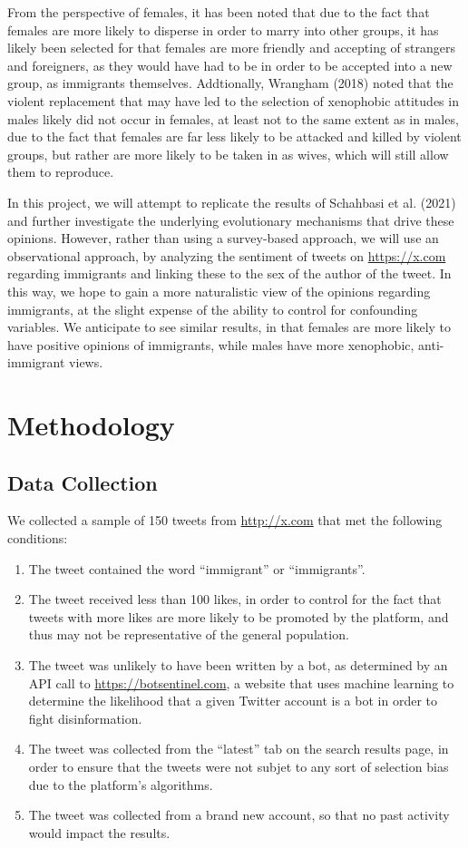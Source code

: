 \documentclass{article}
\begin{document}
From the perspective of females, it has been noted that due to the fact that females are more likely to disperse in order to marry into other groups, it has likely been selected for that females are more friendly and accepting of strangers and foreigners, as they would have had to be in order to be accepted into a new group, as immigrants themselves\cite{femaleOpinions}. Addtionally, Wrangham (2018) noted that the violent replacement that may have led to the selection of xenophobic attitudes in males likely did not occur in females, at least not to the same extent as in males, due to the fact that females are far less likely to be attacked and killed by violent groups, but rather are more likely to be taken in as wives, which will still allow them to reproduce\cite{femaleSafety}.

In this project, we will attempt to replicate the results of Schahbasi et al. (2021) and further investigate the underlying evolutionary mechanisms that drive these opinions. However, rather than using a survey-based approach, we will use an observational approach, by analyzing the sentiment of tweets on \url{https://x.com} regarding immigrants and linking these to the sex of the author of the tweet. In this way, we hope to gain a more naturalistic view of the opinions regarding immigrants, at the slight expense of the ability to control for confounding variables. We anticipate to see similar results, in that females are more likely to have positive opinions of immigrants, while males have more xenophobic, anti-immigrant views.

\section{Methodology}

\subsection{Data Collection}

We collected a sample of 150 tweets from \url{http://x.com} that met the following conditions:
\begin{enumerate}
    \item The tweet contained the word ``immigrant'' or ``immigrants''.
    \item The tweet received less than 100 likes, in order to control for the fact that tweets with more likes are more likely to be promoted by the platform, and thus may not be representative of the general population.
    \item The tweet was unlikely to have been written by a bot, as determined by an API call to \url{https://botsentinel.com}, a website that uses machine learning to determine the likelihood that a given Twitter account is a bot in order to fight disinformation.
    \item The tweet was collected from the ``latest'' tab on the search results page, in order to ensure that the tweets were not subjet to any sort of selection bias due to the platform's algorithms.
    \item The tweet was collected from a brand new account, so that no past activity would impact the results.
\end{enumerate}
\end{document}

